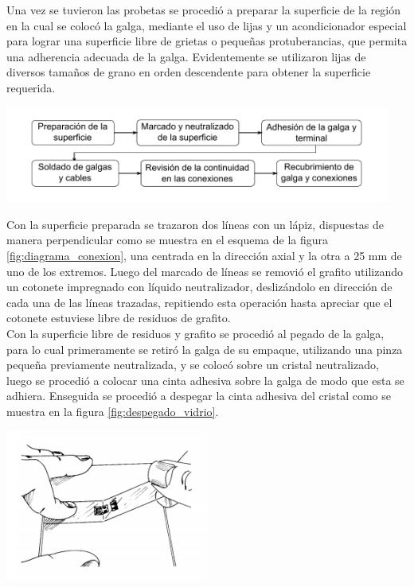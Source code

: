 Una vez se tuvieron las probetas se procedió a preparar la superficie de la región en 
la cual se colocó la galga, mediante el uso de lijas y un acondicionador especial 
para lograr una superficie libre de grietas o pequeñas protuberancias, que permita 
una adherencia adecuada de la galga. Evidentemente se utilizaron lijas de diversos 
tamaños de grano en orden descendente para obtener la superficie requerida.\\

\begin{center}
\includegraphics[width=0.95\textwidth]{src/ch3/metodologia_instrumentacion.pdf}
\label{fig:metodologia_instrumentacion}
\end{center}

Con la superficie preparada se trazaron dos líneas con un lápiz, dispuestas de manera perpendicular 
como se muestra en el esquema de la figura \ref{fig:diagrama_conexion}, una centrada en 
la dirección axial y la otra a 25 mm de uno de los extremos. Luego del marcado de líneas 
se removió el grafito utilizando un cotonete impregnado con líquido neutralizador, deslizándolo en 
dirección de cada una de las líneas trazadas, repitiendo esta operación hasta apreciar que 
el cotonete estuviese libre de residuos de grafito. \\


Con la superficie libre de residuos y grafito se procedió al pegado de la galga, para lo cual 
primeramente se retiró la galga de su empaque, utilizando una pinza pequeña previamente neutralizada, 
y se colocó sobre un cristal neutralizado, luego se procedió a colocar una cinta adhesiva sobre la 
galga de modo que esta se adhiera. Enseguida se procedió a despegar la cinta adhesiva del cristal  
como se muestra en la figura \ref{fig:despegado_vidrio}.

\begin{center}
\includegraphics[width=0.5\textwidth]{src/ch3/despegado_vidrio.png}
\label{fig:despegado_vidrio}
\end{center}

